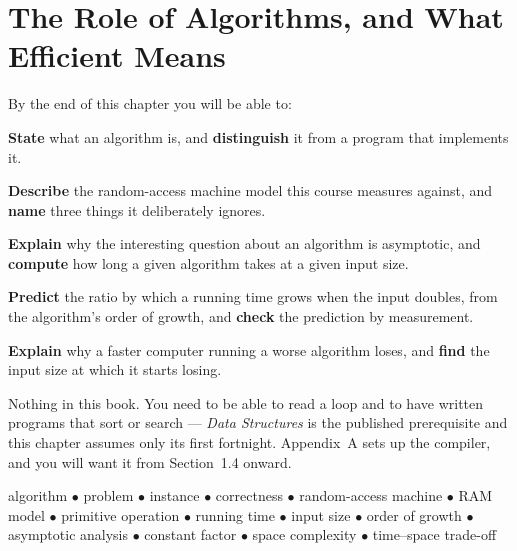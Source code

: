 \chapter{The Role of Algorithms, and What Efficient Means}\label{ch:role}

\begin{outcomes}
By the end of this chapter you will be able to:
\begin{tight}
  \item \textbf{State} what an algorithm is, and \textbf{distinguish} it from a
        program that implements it.
  \item \textbf{Describe} the random-access machine model this course measures
        against, and \textbf{name} three things it deliberately ignores.
  \item \textbf{Explain} why the interesting question about an algorithm is
        asymptotic, and \textbf{compute} how long a given algorithm takes at a
        given input size.
  \item \textbf{Predict} the ratio by which a running time grows when the input
        doubles, from the algorithm's order of growth, and \textbf{check} the
        prediction by measurement.
  \item \textbf{Explain} why a faster computer running a worse algorithm loses,
        and \textbf{find} the input size at which it starts losing.
\end{tight}
\end{outcomes}

\begin{prereq}
Nothing in this book. You need to be able to read a loop and to have written
programs that sort or search --- \emph{Data Structures} is the published
prerequisite and this chapter assumes only its first fortnight. Appendix~A sets
up the compiler, and you will want it from Section~1.4 onward.
\end{prereq}

\begin{keyterms}
algorithm $\bullet$ problem $\bullet$ instance $\bullet$ correctness $\bullet$
random-access machine $\bullet$ RAM model $\bullet$ primitive operation
$\bullet$ running time $\bullet$ input size $\bullet$ order of growth $\bullet$
asymptotic analysis $\bullet$ constant factor $\bullet$ space complexity
$\bullet$ time--space trade-off
\end{keyterms}

